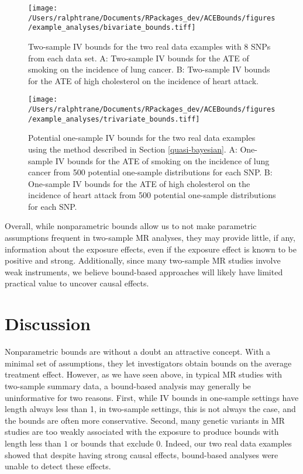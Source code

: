 \documentclass[AMA,STIX1COL,]{WileyNJD-v2}
\begin{document}
\begin{figure}[ht]
  \centering
  \texttt{[image: /Users/ralphtrane/Documents/RPackages\_dev/ACEBounds/figures/example\_analyses/bivariate\_bounds.tiff]}
  \caption{Two-sample IV bounds for the two real data examples with 8 SNPs from each data set. A: Two-sample IV bounds for the ATE of smoking on the incidence of lung cancer. B: Two-sample IV bounds for the ATE of high cholesterol on the incidence of heart attack.}
  \label{fig:two-sample-bounds}
\end{figure}

\begin{figure}[ht]
  \centering
  \texttt{[image: /Users/ralphtrane/Documents/RPackages\_dev/ACEBounds/figures/example\_analyses/trivariate\_bounds.tiff]}
  \caption{Potential one-sample IV bounds for the two real data examples using the method described in Section \ref{quasi-bayesian}. A: One-sample IV bounds for the ATE of smoking on the incidence of lung cancer from 500 potential one-sample distributions for each SNP. B: One-sample IV bounds for the ATE of high cholesterol on the incidence of heart attack from 500 potential one-sample distributions for each SNP.}
  \label{fig:one-sample-bounds}
\end{figure}

Overall, while nonparametric bounds allow us to not make parametric
assumptions frequent in two-sample MR analyses, they may provide little,
if any, information about the exposure effects, even if the exposure
effect is known to be positive and strong. Additionally, since many
two-sample MR studies involve weak instruments, we believe bound-based
approaches will likely have limited practical value to uncover causal
effects.

\hypertarget{discussion}{%
\section{Discussion}\label{discussion}}

\label{conclusion-and-practical-considerations}

Nonparametric bounds are without a doubt an attractive concept. With a
minimal set of assumptions, they let investigators obtain bounds on the
average treatment effect. However, as we have seen above, in typical MR
studies with two-sample summary data, a bound-based analysis may
generally be uninformative for two reasons. First, while IV bounds in
one-sample settings have length always less than 1, in two-sample
settings, this is not always the case, and the bounds are often more
conservative. Second, many genetic variants in MR studies are too weakly
associated with the exposure to produce bounds with length less than
\(1\) or bounds that exclude \(0\). Indeed, our two real data examples
showed that despite having strong causal effects, bound-based analyses
were unable to detect these effects.
\end{document}
